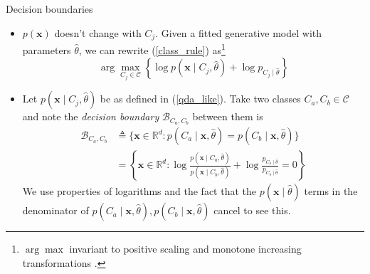 \documentclass{beamer}
\numberwithin{equation}{section}
\newcommand{\aref}[1]{\alert{\ref{#1}}}
\begin{document}
\begin{frame}{Decision boundaries}
    \begin{itemize}
        \item
        $ p(\mathbf{x}) $ doesn't change with $ C_j $. Given a fitted
        generative model with parameters $ \hat{\theta} $, we can rewrite
        (\aref{class_rule}) as\footnote{
            $ \arg\max $ invariant to positive scaling and monotone
            increasing transformations \cite{bv_convex_opt}.
        }
        \begin{equation*}
            \arg\max_{C_j \in \mathcal{C}}\left\{
                \log p(\mathbf{x} \mid C_j, \hat{\theta}) +
                \log p_{C_j \mid \hat{\theta}}
            \right\}
        \end{equation*}

        \item
        Let $ p(\mathbf{x} \mid C_j, \hat{\theta}) $ be as defined in
        (\aref{qda_like}). Take two classes $ C_a, C_b \in \mathcal{C} $ and
        note the \textit{decision boundary} $ \mathcal{B}_{C_a, C_b} $ between
        them is
        \begin{equation} \label{decision_boundary}
            \begin{split}
            \mathcal{B}_{C_a, C_b} & \triangleq \{\mathbf{x} \in \mathbb{R}^d :
                p(C_a \mid \mathbf{x}, \hat{\theta}) =
                p(C_b \mid \mathbf{x}, \hat{\theta})\} \\ & =
                \left\{
                    \mathbf{x} \in \mathbb{R}^d : \log\frac{
                        p(\mathbf{x} \mid C_a, \hat{\theta})
                    }{p(\mathbf{x} \mid C_b, \hat{\theta})} + \log\frac{
                        p_{C_a \mid \hat{\theta}}
                    }{p_{C_b \mid \hat{\theta}}} = 0
                \right\}
            \end{split}
        \end{equation}
        We use properties of logarithms and the fact that the
        $ p(\mathbf{x} \mid \hat{\theta}) $ terms in the denominator of
        $ p(C_a \mid \mathbf{x}, \hat{\theta}), p(C_b \mid \mathbf{x},
        \hat{\theta}) $ cancel to see this.
    \end{itemize}

    \medskip
\end{frame}
\end{document}
